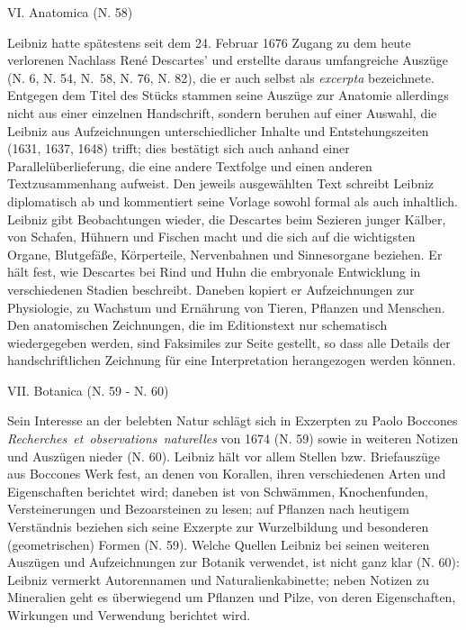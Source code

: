 \par
\vspace{3.0ex}
\noindent
VI. Anatomica (N. 58)
\vspace{1.0ex}
\par\noindent
Leibniz hatte spätestens seit dem 24. Februar 1676 Zugang zu dem heute verlorenen Nachlass René Descartes' und erstellte daraus umfangreiche Auszüge (N. 6, N. 54, N.~58, N. 76, N. 82), die er auch selbst als \textit{excerpta} bezeichnete. Entgegen dem Titel des Stücks stammen seine Auszüge zur Anatomie allerdings nicht aus einer einzelnen Handschrift, sondern beruhen auf einer Auswahl, die Leibniz aus Aufzeichnungen unterschiedlicher Inhalte und Entstehungszeiten (1631, 1637, 1648) trifft; dies bestätigt sich auch anhand einer Parallelüberlieferung, die eine andere Textfolge und einen anderen Textzusammenhang aufweist. Den jeweils ausgewählten Text schreibt Leibniz diplomatisch ab und kommentiert seine Vorlage sowohl formal als auch inhaltlich. Leibniz gibt Beobachtungen wieder, die Descartes beim Sezieren junger Kälber, von Schafen, Hühnern und Fischen macht und die sich auf die wichtigsten Organe, Blutgefä{\ss}e, Körperteile, Nervenbahnen und Sinnesorgane beziehen. Er hält fest, wie Descartes bei Rind und Huhn die embryonale Entwicklung in verschiedenen Stadien beschreibt. Daneben kopiert er Aufzeichnungen zur Physiologie, zu Wachstum und Ernährung von Tieren, Pflanzen und Menschen. Den anatomischen Zeichnungen, die im Editionstext nur schematisch wiedergegeben werden, sind Faksimiles zur Seite gestellt, so dass alle Details der handschriftlichen Zeichnung für eine Interpretation herangezogen werden können. 
\par
\vspace{3.0ex}
\noindent
VII. Botanica (N. 59 - N. 60)
\vspace{1.0ex}
\par\noindent
Sein Interesse an der belebten Natur schlägt sich in Exzerpten zu Paolo Boccones \mbox{\textit{Recherches et observations naturelles}} von 1674 (N. 59) sowie in weiteren Notizen und Auszügen nieder (N. 60). Leibniz hält vor allem Stellen bzw. Briefauszüge aus Boccones Werk fest, an denen von Korallen, ihren verschiedenen Arten und Eigenschaften berichtet wird; daneben ist von Schwämmen, Knochenfunden, Versteinerungen und Bezoarsteinen zu lesen; auf Pflanzen nach heutigem Verständnis beziehen sich seine Exzerpte zur Wurzelbildung und besonderen (geometrischen) Formen (N. 59). Welche Quellen Leibniz bei seinen weiteren Auszügen und Aufzeichnungen zur Botanik verwendet, ist nicht ganz klar (N. 60): Leibniz vermerkt Autorennamen und Naturalienkabinette; neben Notizen zu Mineralien geht es überwiegend um Pflanzen und Pilze, von deren Eigenschaften, Wirkungen und Verwendung berichtet wird. 
